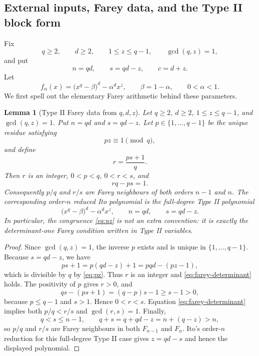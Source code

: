 \documentclass[11pt]{article}
\newtheorem{lemma}[theorem]{Lemma}
\theoremstyle{definition}
\theoremstyle{remark}
\begin{document}
\subsection{External inputs, Farey data, and the Type II block form}

Fix
\[
        q\ge 2,
        \qquad d\ge 2,
        \qquad 1\le z\le q-1,
        \qquad \gcd(q,z)=1,
\]
and put
\[
        n=qd,
        \qquad s=qd-z,
        \qquad c=d+z .
\]
Let
\[
        f_\alpha(x)=\bigl(x^q-\beta\bigr)^d-\alpha^d x^z,
        \qquad \beta=1-\alpha,
        \qquad 0<\alpha<1 .
\]
We first spell out the elementary Farey arithmetic behind these parameters.

\begin{lemma}[Type II Farey data from $q,d,z$]
\label{lem:typeII-farey}
Let $q\ge2$, $d\ge2$, $1\le z\le q-1$, and $\gcd(q,z)=1$.  Put $n=qd$ and $s=qd-z$.  Let $p\in\{1,\ldots,q-1\}$ be the unique residue satisfying
\begin{equation}
        pz\equiv1\pmod q,
        \label{eq:pz}
\end{equation}
and define
\[
        r=\frac{ps+1}{q}.
\]
Then $r$ is an integer, $0<p<q$, $0<r<s$, and
\begin{equation}
        rq-ps=1 .
        \label{eq:farey-determinant}
\end{equation}
Consequently $p/q$ and $r/s$ are Farey neighbours of both orders $n-1$ and $n$.  The corresponding order-$n$ reduced Ito polynomial is the full-degree Type II polynomial
\[
        \bigl(x^q-\beta\bigr)^d-\alpha^d x^z,
        \qquad n=qd,
        \qquad s=qd-z .
\]
In particular, the congruence \eqref{eq:pz} is not an extra convention: it is exactly the determinant-one Farey condition written in Type II variables.
\end{lemma}

\begin{proof}
Since $\gcd(q,z)=1$, the inverse $p$ exists and is unique in $\{1,\ldots,q-1\}$.  Because $s=qd-z$, we have
\[
        ps+1=p(qd-z)+1=pqd-(pz-1),
\]
which is divisible by $q$ by \eqref{eq:pz}.  Thus $r$ is an integer and \eqref{eq:farey-determinant} holds.  The positivity of $p$ gives $r>0$, and
\[
        qs-(ps+1)=(q-p)s-1\ge s-1>0,
\]
because $p\le q-1$ and $s>1$.  Hence $0<r<s$.  Equation \eqref{eq:farey-determinant} implies both $p/q<r/s$ and $\gcd(r,s)=1$.  Finally,
\[
        q<s\le n-1,
        \qquad q+s=q+qd-z=n+(q-z)>n,
\]
so $p/q$ and $r/s$ are Farey neighbours in both $F_{n-1}$ and $F_n$.  Ito's order-$n$ reduction for this full-degree Type II case gives $z=qd-s$ and hence the displayed polynomial.
\end{proof}
\end{document}
